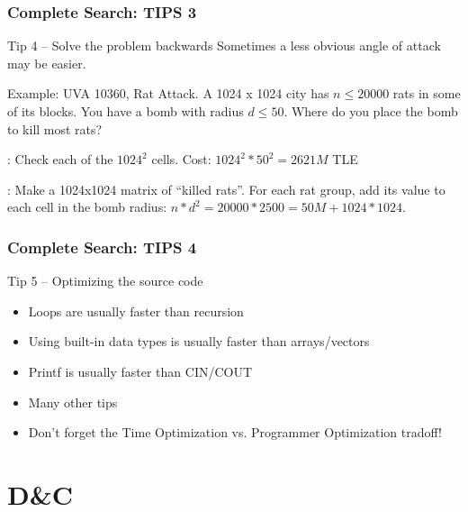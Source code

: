 \documentclass{beamer}
\begin{document}
\begin{frame}
  \frametitle{Complete Search: TIPS 3}
  {\smaller
    \begin{block}{Tip 4 -- Solve the problem backwards}
      Sometimes a less obvious angle of attack may be easier.

      \medskip

      Example: UVA 10360, Rat Attack. A 1024 x 1024 city has $n \leq 20000$ rats in
      some of its blocks. You have a bomb with radius $d \leq
      50$. Where do you place the bomb to kill most rats?

      \medskip

      : Check each of the $1024^2$
      cells. Cost: $1024^2*50^2 = 2621M$ TLE

      \medskip

      : Make a 1024x1024 matrix of
      ``killed rats''. For each rat group, add its value to each cell in the 
      bomb radius: $n * d^2 = 20000*2500 = 50M + 1024*1024$.
    \end{block}
    
  }
\end{frame}

\begin{frame}
  \frametitle{Complete Search: TIPS 4}

  {\smaller
    \begin{block}{Tip 5 -- Optimizing the source code}
      \begin{itemize}
      \item Loops are usually faster than recursion
      \item Using built-in data types is usually faster than arrays/vectors
      \item Printf is usually faster than CIN/COUT
      \item Many other tips

        \bigskip
        
      \item Don't forget the Time Optimization vs. Programmer
        Optimization tradoff!
      \end{itemize}
      
    \end{block}
  }
\end{frame}


\section{D\&C}
\end{document}
